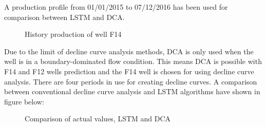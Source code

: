 \documentclass[12pt,a4paper]{report}
\begin{document}
A production profile from 01/01/2015 to 07/12/2016 has been used for comparison between LSTM and DCA.
\begin{figure}[H]
  \centering
  \caption{History production of well F14}
\end{figure}

Due to the limit of decline curve analysis methods, DCA is only used when the well is in a boundary-dominated flow condition. This means DCA is possible with F14 and F12 wells prediction and the F14 well is chosen for using decline curve analysis. There are four periods in use for creating decline curves. A comparison between conventional decline curve analysis and LSTM algorithms have shown in figure below:
\begin{figure}[H]
  \centering
  \caption{Comparison of actual values, LSTM and DCA}
\end{figure}
\end{document}
